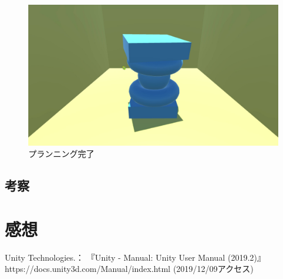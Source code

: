 \documentclass[12pt]{jarticle}
\begin{document}
\begin{figure}[!hbt]
  	\begin{center}
  		\includegraphics[scale=0.2]{images/bwp7.jpg}
	\end{center}
  	\caption{プランニング完了}
\end{figure}
\clearpage

\subsection{考察}


\section{感想}


\begin{thebibliography}{99}
Unity Technologies.： 『Unity - Manual: Unity User Manual (2019.2)』 https://docs.unity3d.com/Manual/index.html (2019/12/09アクセス) \\
\end{thebibliography}
\end{document}
